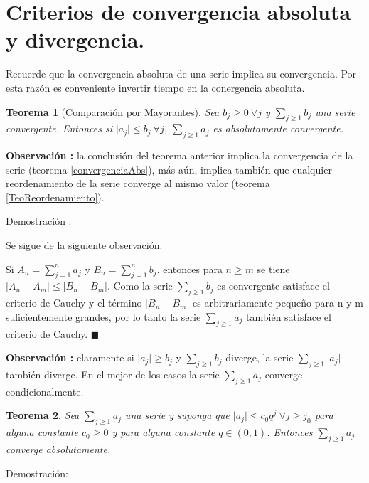\documentclass[12pt]{book}
\providecommand{\abs}[1]{\lvert#1\rvert}
\newtheorem{teo}{Teorema}[section]
\begin{document}
\section{Criterios de convergencia absoluta y divergencia.}
Recuerde que la convergencia absoluta de una serie implica su convergencia. Por esta razón es conveniente invertir tiempo en la conergencia absoluta.
\begin{teo}[Comparación por Mayorantes]\rm
Sea $b_j \ge 0 \ \forall{j}$ y $\sum_{j \ge 1}b_j$ una serie convergente. Entonces si $\abs{a_j} \le b_j \ \forall{j}$, $\sum_{j \ge 1}a_j$ es absolutamente convergente.
\end{teo}
\textbf{Observación : }la conclusión del teorema anterior implica la convergencia de la serie (teorema \ref{convergenciaAbs}), más aún, implica también que cualquier reordenamiento de la serie converge al mismo valor (teorema \ref{TeoReordenamiento}).

Demostración :

Se sigue de la siguiente observación.

Si $A_n=\sum_{j=1}^na_j$ y $B_n=\sum_{j=1}^nb_j$, entonces para $n \ge m$ se tiene $\abs{A_n-A_m} \le \abs{B_n-B_m}$. Como la serie $\sum_{j \ge 1}b_j$ es convergente satisface el criterio de Cauchy y el término $\abs{B_n-B_m}$ es arbitrariamente pequeño para n y m suficientemente grandes, por lo tanto la serie $\sum_{j \ge 1}a_j$ también satisface el criterio de Cauchy. $\blacksquare$

\textbf{Observación :} claramente si $\abs{a_j} \ge b_j$ y $\sum_{j \ge 1}b_j$ diverge, la serie $\sum_{j \ge 1}\abs{a_j}$ también diverge. En el mejor de los casos la serie $\sum_{j \ge 1}a_j$ converge condicionalmente.
\begin{teo}\rm
Sea $\sum_{j \ge 1}a_j$ una serie y suponga que $\abs{a_j} \le c_0q^j \ \forall{j \ge j_0}$ para alguna constante $c_0 \ge 0$ y para alguna constante $q \in (0,1)$. Entonces $\sum_{j \ge 1}a_j$ converge absolutamente.
\end{teo}
Demostración:
\end{document}
